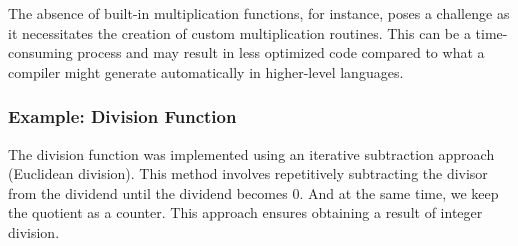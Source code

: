 \documentclass{article}
\begin{document}
The absence of built-in multiplication functions, for instance, poses a challenge as it necessitates the creation of custom multiplication routines. This can be a time-consuming process and may result in less optimized code compared to what a compiler might generate automatically in higher-level languages.

\subsubsection{Example: Division Function}
The division function was implemented using an iterative subtraction approach (Euclidean division). This method involves repetitively subtracting the divisor from the dividend until the dividend becomes 0. And at the same time, we keep the quotient as a counter. This approach ensures obtaining a result of integer division.\\
\end{document}
